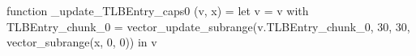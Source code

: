 function _update_TLBEntry_caps0 (v, x) = let v = { v with TLBEntry_chunk_0 = vector_update_subrange(v.TLBEntry_chunk_0, 30, 30, vector_subrange(x, 0, 0)) } in v
